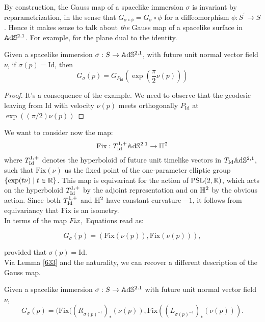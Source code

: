     By construction, the Gauss map of a spacelike immersion $\sigma$ is invariant by reparametrization, in the sense that $G_{\sigma\circ\phi}=G_\sigma\circ\phi$ for a diffeomorphism $\phi:S^{\prime} \to S$. Hence it makes sense to talk about \textit{the} Gauss map of a spacelike surface in $\mathbb{A}\mathrm{d}\mathbb{S}^{2,1}$. For example, for the plane dual to the identity. 
    
    \begin{lemma}\label{633}
        Given a spacelike immersion $\sigma:S\to\mathbb{A}\mathrm{d}\mathbb{S}^{2,1}$, with future unit normal vector field $\nu$, if $\sigma(p)=\text{Id}$, then 
        \begin{equation}\label{gaussmap}
            G_\sigma(p)=G_{P_\text{Id}}(\exp(\frac{\pi}{2}\nu(p)))
        \end{equation}
    \end{lemma}
    \begin{proof}
        It's a consequence of the example. We need to observe that the geodesic leaving from Id with velocity $\nu(p)$ meets orthogonally $P_\text{Id}$ at $\exp((\pi/2)\nu(p))$
    \end{proof}

    We want to consider now the map: 
    \[
        \text{Fix}:T_{\text{Id}}^{1,+}\mathbb{A}\mathrm{d}\mathbb{S}^{2.1}\to\mathbb{H}^2
    \]
    where $T_{\text{Id}}^{1,+}$ denotes the hyperboloid of future unit timelike vectors in $T_{\text{Id}}\mathbb{A}\mathrm{d}\mathbb{S}^{2,1}$, such that $\text{Fix}(\nu)$ us the fixed point of the one-parameter elliptic group $\{\exp(t\nu)\;|\;t\in\mathbb{R}\}$. This map is equivariant for the action of $\text{PSL}(2,\mathbb{R})$, which acts on the hyperboloid $T_{\text{Id}}^{1,+}$ by the adjoint representation and on $\mathbb{H}^2$ by the obvious action. Since both $T_{\text{Id}}^{1,+}$ and $\mathbb{H}^2$ have constant curvature $-1$, it follows from equivariancy that $\text{Fix}$ is an isometry.  \\
    In terms of the map $\textit{Fix},$ Equations  read as: 

    \begin{equation}\label{66}
        G_\sigma(p)=(\text{Fix}(\nu(p)),\text{Fix}(\nu(p))),
    \end{equation}

    provided that $\sigma(p)=\text{Id}.$\\ Via Lemma \ref{633} and the naturality, we can recover a different description of the Gauss map. 

    \begin{lemma}
        Given a spacelike immersion $\sigma: S\to \mathbb{A}\mathrm{d}\mathbb{S}^{2.1}$ with future unit normal vector field $\nu$,
        \[
            G_\sigma(p)=(\text{Fix}((R_{\sigma(p)^{-1}})_* (\nu(p)),\text{Fix}((L_{\sigma(p)^{-1}})_* (\nu(p))).
     \]
    \end{lemma}


